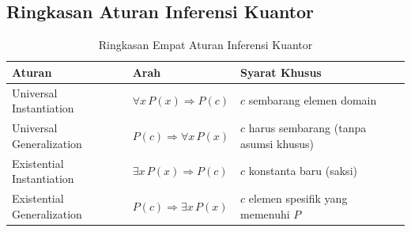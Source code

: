 \subsection{Ringkasan Aturan Inferensi Kuantor}

\begin{table}[htbp]
\centering
\renewcommand{\arraystretch}{1.3}
\begin{tabular}{|p{4cm}|p{3.5cm}|p{4.5cm}|}
\hline
\textbf{Aturan} & \textbf{Arah} & \textbf{Syarat Khusus} \\ \hline
Universal Instantiation & $\forall x\, P(x) \Rightarrow P(c)$ & $c$ sembarang elemen domain \\ \hline
Universal Generalization & $P(c) \Rightarrow \forall x\, P(x)$ & $c$ harus sembarang (tanpa asumsi khusus) \\ \hline
Existential Instantiation & $\exists x\, P(x) \Rightarrow P(c)$ & $c$ konstanta baru (saksi) \\ \hline
Existential Generalization & $P(c) \Rightarrow \exists x\, P(x)$ & $c$ elemen spesifik yang memenuhi $P$ \\ \hline
\end{tabular}
\caption{Ringkasan Empat Aturan Inferensi Kuantor}
\end{table}

